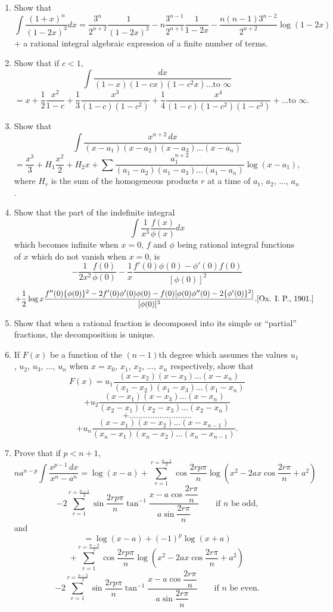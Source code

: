 \documentclass[11pt, a4paper]{article}
\newcommand{\source}[1]{\hfill\textnormal{[#1]}}
\begin{document}
\begin{enumerate}[leftmargin=2em]
\item Show that
\[
\int \dfrac{(1+x)^n}{(1-2x)^3}dx = \dfrac{3^n}{2^{n+2}}\dfrac{1}{(1-2x)^2}-n\dfrac{3^{n-1}}{2^{n+1}}\dfrac{1}{1-2x}-\dfrac{n(n-1)3^{n-2}}{2^{n+2}}\log(1-2x)
\]
+ a rational integral algebraic expression of a finite number of terms.

\item Show that if $c<1$,
\[
\int \dfrac{dx}{(1-x)(1-cx)(1-c^2x)\dots\text{to }\infty}
\]
\[
=x+\dfrac12\dfrac{x^2}{1-c}+\dfrac13\dfrac{x^3}{(1-c)(1-c^2)}+\dfrac14\dfrac{x^4}{(1-c)(1-c^2)(1-c^3)}+\dots\text{to }\infty.
\]

\item Show that
\[
\int \dfrac{x^{n+2}\,dx}{(x-a_1)(x-a_2)(x-a_3)\dots(x-a_n)}
\]
\[
=\dfrac{x^3}{3}+H_1\dfrac{x^2}{2}+H_2x+\sum \dfrac{a_1^{n+2}}{(a_1-a_2)(a_1-a_3)\dots(a_1-a_n)}\log(x-a_1),
\]
where $H_r$ is the sum of the homogeneous products $r$ at a time of $a_1$, $a_2$, $\dots$, $a_n$.

\item Show that the part of the indefinite integral
\[
\int \dfrac{1}{x^3}\dfrac{f(x)}{\phi(x)}dx
\]
which becomes infinite when $x=0$, $f$ and $\phi$ being rational integral functions of $x$ which do not vanish when $x=0$, is
\[
-\dfrac{1}{2x^2}\dfrac{f(0)}{\phi(0)}-\dfrac1x\dfrac{f'(0)\phi(0)-\phi'(0)f(0)}{[\phi(0)]^2}
\]
\[
+\dfrac12\log x\dfrac{f''(0)\{\phi(0)\}^2-2f'(0)\phi'(0)\phi(0)-f(0)[\phi(0)\phi''(0)-2\{\phi'(0)\}^2]}{[\phi(0)]^3}. \source{Ox. I. P., 1901.}
\]

\item Show that when a rational fraction is decomposed into its simple or ``partial'' fractions, the decomposition is unique.

\item If $F(x)$ be a function of the $(n-1)$th degree which assumes the values $u_1$, $u_2$, $u_3$, $\dots$, $u_n$ when $x=x_0$, $x_1$, $x_2$, $\dots$, $x_n$ respectively, show that
\[
F(x)=u_1\dfrac{(x-x_2)(x-x_3)\dots(x-x_n)}{(x_1-x_2)(x_1-x_3)\dots(x_1-x_n)}
\]
\[
+u_2\dfrac{(x-x_1)(x-x_3)\dots(x-x_n)}{(x_2-x_1)(x_2-x_3)\dots(x_2-x_n)}
\]
\[
+\dots\dots\dots\dots\dots\dots\dots\dots\dots
\]
\[
+u_n\dfrac{(x-x_1)(x-x_2)\dots(x-x_{n-1})}{(x_n-x_1)(x_n-x_2)\dots(x_n-x_{n-1})}.
\]

\item Prove that if $p<n+1$,
\[
na^{n-p}\int \dfrac{x^{p-1}\,dx}{x^n-a^n} = \log(x-a) + \sum_{r=1}^{r=\frac{n-1}{2}}\cos\dfrac{2rp\pi}{n}\log\left(x^2-2ax\cos\dfrac{2r\pi}{n}+a^2\right)
\]
\[
-2\sum_{r=1}^{r=\frac{n-1}{2}}\sin\dfrac{2rp\pi}{n}\tan^{-1}\dfrac{x-a\cos\dfrac{2r\pi}{n}}{a\sin\dfrac{2r\pi}{n}}\qquad\text{if $n$ be odd,}
\]
and
\[
=\log(x-a)+(-1)^p\log(x+a)
\]
\[
+\sum_{r=1}^{r=\frac{n-2}{2}}\cos\dfrac{2rp\pi}{n}\log\left(x^2-2ax\cos\dfrac{2r\pi}{n}+a^2\right)
\]
\[
-2\sum_{r=1}^{r=\frac{n-2}{2}}\sin\dfrac{2rp\pi}{n}\tan^{-1}\dfrac{x-a\cos\dfrac{2r\pi}{n}}{a\sin\dfrac{2r\pi}{n}}\qquad\text{if $n$ be even.}
\]


\end{enumerate}
\end{document}
